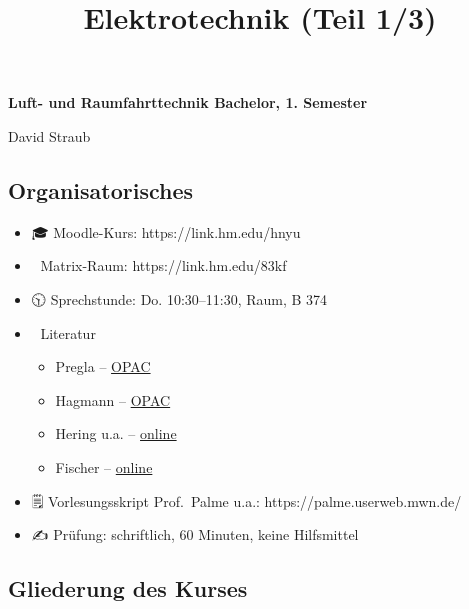 \documentclass[
  11pt,
]{article}
\title{Elektrotechnik (Teil 1/3)}
\author{}
\date{}
\providecommand{\tightlist}{%
  \setlength{\itemsep}{0pt}\setlength{\parskip}{0pt}}
\begin{document}
\maketitle

\textbf{Luft- und Raumfahrttechnik Bachelor, 1. Semester}

David Straub

\subsection{Organisatorisches}\label{organisatorisches}

\begin{itemize}
\tightlist
\item
  🎓 Moodle-Kurs: https://link.hm.edu/hnyu
\item
  💬 Matrix-Raum: https://link.hm.edu/83kf
\item
  🕥 Sprechstunde: Do. 10:30--11:30, Raum, B 374
\item
  📖 Literatur

  \begin{itemize}
  \tightlist
  \item
    Pregla -- \href{https://link.hm.edu/2c6h}{OPAC}
  \item
    Hagmann -- \href{https://link.hm.edu/fvqd}{OPAC}
  \item
    Hering u.a. --
    \href{https://link.springer.com/book/10.1007/978-3-662-67538-0}{online}
  \item
    Fischer --
    \href{https://link.springer.com/book/10.1007/978-3-658-25644-9}{online}
  \end{itemize}
\item
  🗒️ Vorlesungsskript Prof.~Palme u.a.: https://palme.userweb.mwn.de/
\item
  ✍️ Prüfung: schriftlich, 60 Minuten, keine Hilfsmittel
\end{itemize}

\subsection{Gliederung des Kurses}\label{gliederung-des-kurses}
\end{document}
